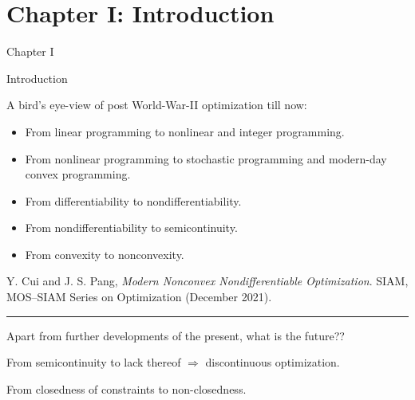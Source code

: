 \documentclass[aspectratio=169,xcolor=dvipsnames]{beamer}
\begin{document}
\section{Chapter I: Introduction}

\begin{frame}[plain]
  \hypertarget{chapter-introduction}{}
  \centering
  \vfill
  {Chapter I\par}
  \vspace{0.34cm}
  {\mdseries\large
    Introduction\par}
  \vfill
\end{frame}

\begin{frame}{A bird's eye-view of post World-War-II optimization till now:}
  \small
  \begin{itemize}
    \setlength{\itemsep}{0.08cm}
    \item From linear programming to nonlinear and integer programming.
    \item From nonlinear programming to stochastic programming and
      modern-day convex programming.
    \item From differentiability to nondifferentiability.
    \item From nondifferentiability to semicontinuity.
    \item From convexity to nonconvexity.
  \end{itemize}

  \vspace{0.02cm}
  {\color{MediumBlue}\scriptsize
    Y. Cui and J. S. Pang, \textit{Modern Nonconvex Nondifferentiable
    Optimization}. SIAM, MOS--SIAM Series on Optimization
    (December 2021).\par}

  \vspace{0.12cm}
  {\color{MediumBlue}\rule{0.54\textwidth}{0.45pt}\par}
  \vspace{0.10cm}

  {\color{MediumBlue}\small
    Apart from further developments of the present, what is the future??\par}
  \vspace{0.05cm}
  {\small
    From semicontinuity to lack thereof
    $\Rightarrow$ discontinuous optimization.\par
    \vspace{0.05cm}
    From closedness of constraints to non-closedness.\par}
\end{frame}
\end{document}
